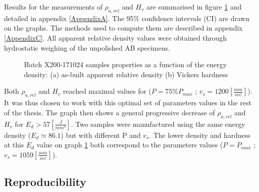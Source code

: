 Results for the measurements of $\rho_{a,rel}$ and $H_v$ are summarised in figure \ref{fig:HD2-171024} and detailed in appendix \ref{AppendixA}. The 95\% confidence intervals (CI) are drawn on the graphs. The methods used to compute them are described in appendix \ref{AppendixC}. All apparent relative density values were obtained through hydrostatic weighing of the unpolished AB specimens.\\

\begin{figure}[ht]
\centering
\noindent{}
\decoRule
\caption[Batch X200-171024 samples properties as a function of the energy density: (a) as-built apparent relative density (b) Vickers hardness]{Batch X200-171024 samples properties as a function of the energy density: (a) as-built apparent relative density (b) Vickers hardness}
\label{fig:HD2-171024}
\end{figure} 

Both $\rho_{a,rel}$ and $H_v$ reached maximal values for ($P=75\% P_{max}$ ; $v_s=1200 [\frac{mm}{sec}]$). It was thus chosen to work with this optimal set of parameters values in the rest of the thesis. The graph then shows a general progressive decrease of  $\rho_{a,rel}$ and $H_v$ for $E_d>57 [\frac{J}{mm^3}]$. Two samples were manufactured using the same energy density ($E_d \simeq 86.1$) but with different P and $v_s$. The lower density and hardness at this $E_d$ value on graph \ref{fig:HD2-171024} both correspond to the parameters values ($P=P_{max}$ ; $v_s=1059 [\frac{mm}{sec}]$).


\subsection{Reproducibility}
\label{RReprod}
